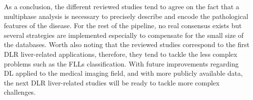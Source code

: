 \documentclass[]{article}
\begin{document}
As a conclusion, the different reviewed studies tend to agree on the
fact that a multiphase analysis is necessary to precisely describe and
encode the pathological features of the disease. For the rest of the
pipeline, no real consensus exists but several strategies are
implemented especially to compensate for the small size of the
databases. Worth also noting that the reviewed studies correspond to the
first DLR liver-related applications, therefore, they tend to tackle the
less complex problems such as the FLLs classification. With future
improvements regarding DL applied to the medical imaging field, and with
more publicly available data, the next DLR liver-related studies will be
ready to tackle more complex challenges.

\newpage
	
	
\end{document}
